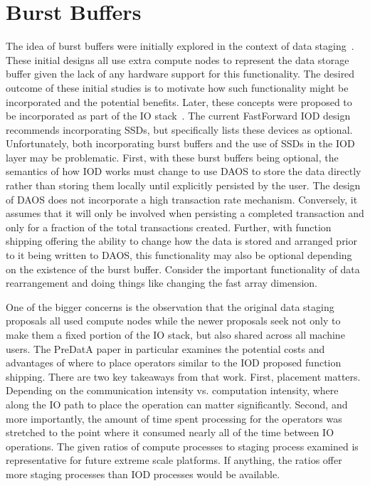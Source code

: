 \documentclass[conference]{sig-alt-gov2}
\begin{document}
\section{Burst Buffers}
\label{sec:burst}

The idea of burst buffers were initially explored in the context of data
staging~\cite{abbasi:2007:datatap,Abbasi:2009:datatap,nisar:2008:staging,zheng:2010:predata}.
These initial designs all use extra compute nodes to represent the data storage
buffer given the lack of any hardware support for this functionality. The
desired outcome of these initial studies is to motivate how such functionality
might be incorporated and the potential benefits.  Later, these concepts were
proposed to be incorporated as part of the IO
stack~\cite{bent:2012:challenges,bent:2012:burst-buffer}.  The current
FastForward IOD design recommends incorporating SSDs, but specifically lists
these devices as optional. Unfortunately, both incorporating burst buffers and
the use of SSDs in the IOD layer may be problematic.  First, with these burst
buffers being optional, the semantics of how IOD works must change to use DAOS
to store the data directly rather than storing them locally until explicitly
persisted by the user. The design of DAOS does not incorporate a high
transaction rate mechanism. Conversely, it assumes that it will only be
involved when persisting a completed transaction and only for a fraction of the
total transactions created. Further, with function shipping offering the
ability to change how the data is stored and arranged prior to it being written
to DAOS, this functionality may also be optional depending on the existence of
the burst buffer. Consider the important functionality of data rearrangement
and doing things like changing the fast array dimension.

One of the bigger concerns is the observation that the original data staging
proposals all used compute nodes while the newer proposals seek not only to
make them a fixed portion of the IO stack, but also shared across all machine
users. The PreDatA paper in particular examines the potential costs and
advantages of where to place operators similar to the IOD proposed function
shipping. There are two key takeaways from that work. First, placement matters.
Depending on the communication intensity vs. computation intensity, where
along the IO path to place the operation can matter significantly. Second, and
more importantly, the amount of time spent processing for the operators was
stretched to the point where it consumed nearly all of the time between IO
operations. The given ratios of compute processes to staging process examined
is representative for future extreme scale platforms. If anything, the ratios
offer more staging processes than IOD processes would be available.
\end{document}

